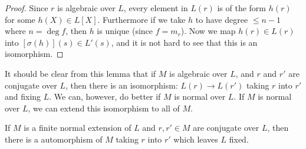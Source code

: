 \begin{proof}
Since $r$ is algebraic over $L$, every element in $L(r)$ is of the form $h(r)$ for some $h(X)\in L[X]$. Furthermore if we take $h$ to have degree $\leq n-1$ where $n=\deg f$, then $h$ is unique (since $f=m_{r}$). Now we map $h(r)\in L(r)$ into $[\sigma(h)](s)\in L'(s)$, and it is not hard to see that this is an isomorphism.
\end{proof}

It should be clear from this lemma that if $M$ is algebraic over $L$, and $r$ and $r'$ are conjugate over $L$, then there is an isomorphism: $L(r)\rightarrow L(r')$ taking $r$ into $r'$ and fixing $L$. We can, however, do better if $M$ is normal over $L$. If $M$ is normal over $L$, we can extend this isomorphism to all of $M$.

\begin{theo}
\label{t2.5.5}
If $M$ is a finite normal extension of $L$ and $r, r'\in M$ are conjugate over $L$, then there is a automorphism of $M$ taking $r$ into $r'$ which leaves $L$ fixed.
\end{theo}

